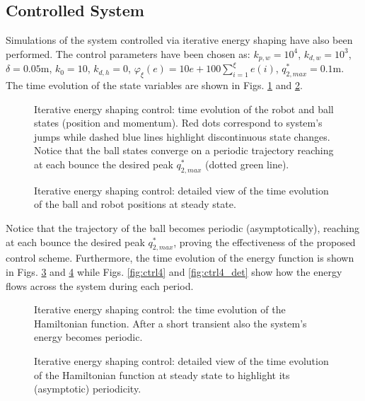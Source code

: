 \subsection{Controlled System}
%
Simulations of the system controlled via iterative energy shaping have also been performed. The control parameters have been chosen as: $k_{p,w} = 10^4$, $k_{d,w} = 10^3$, $\delta = 0.05$m, $k_0 = 10$, $k_{d,h} = 0$, $\varphi_\xi(e) = 10e + 100\sum_{i = 1}^{\xi}e(i)$, $q_{2,max}^* = 0.1$m. The time evolution of the state variables are shown in Figs. \ref{fig:ctrl1} and \ref{fig:ctrl1_det}.
%
\begin{figure}[!ht]
	\centering
	\caption[Iterative energy shaping control: time evolution of the robot and ball states]{Iterative energy shaping control: time evolution of the robot and ball states (position and momentum). Red dots correspond to system's jumps while dashed blue lines highlight discontinuous state changes. Notice that the ball states converge on a periodic trajectory reaching at each bounce the desired peak $q^*_{2,max}$ (dotted green line).}
	\label{fig:ctrl1}
\end{figure}
%
%
\begin{figure}[!ht]
	\centering
	\caption[Iterative energy shaping control: detailed view of the time evolution of the ball and robot positions at steady state]{Iterative energy shaping control: detailed view of the time evolution of the ball and robot positions at steady state.}
	\label{fig:ctrl1_det}
\end{figure}
%
%
Notice that the trajectory of the ball becomes periodic (asymptotically), reaching at each bounce the desired peak $q_{2,max}^*$, proving the effectiveness of the proposed control scheme. Furthermore, the time evolution of the energy function is shown in Figs. \ref{fig:ctrl3} and \ref{fig:ctrl3_det} while Figs. \ref{fig:ctrl4} and \ref{fig:ctrl4_det} show how the energy flows across the system during each period. 
%
\begin{figure}[!ht]
	\centering
	\caption{Iterative energy shaping control: the time evolution of the Hamiltonian function. After a short transient also the system's energy becomes periodic.}
	\label{fig:ctrl3}
\end{figure}
%
\begin{figure}[!ht]
	\centering
	\caption{Iterative energy shaping control: detailed view of the time evolution of the Hamiltonian function at steady state to highlight its (asymptotic) periodicity.}
	\label{fig:ctrl3_det}
\end{figure}
